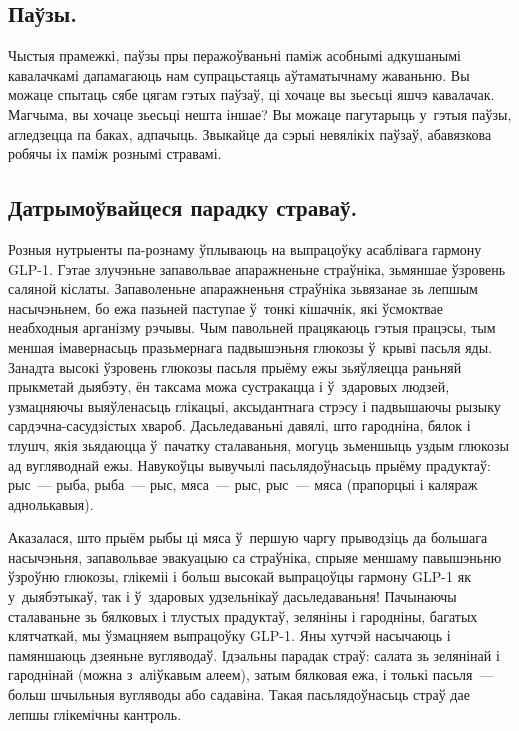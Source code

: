
\subsection{Паўзы.}
Чыстыя прамежкі, паўзы пры перажоўваньні паміж асобнымі адкушанымі кавалачкамі дапамагаюць нам супрацьстаяць аўтаматычнаму жаваньню. Вы можаце спытаць сябе цягам гэтых паўзаў, ці хочаце вы зьесьці яшчэ кавалачак. Магчыма, вы хочаце зьесьці нешта іншае? Вы можаце пагутарыць у~гэтыя паўзы, агледзецца па баках, адпачыць. Звыкайце да сэрыі невялікіх паўзаў, абавязкова робячы іх паміж рознымі стравамі.

\subsection{Датрымоўвайцеся парадку страваў.}
Розныя нутрыенты па-рознаму ўплываюць на выпрацоўку асаблівага гармону GLP-1. Гэтае злучэньне запавольвае апаражненьне страўніка, зьмяншае ўзровень саляной кіслаты. Запаволеньне апаражненьня страўніка зьвязанае зь лепшым насычэньнем, бо ежа пазьней паступае ў~тонкі кішачнік, які ўсмоктвае неабходныя арганізму рэчывы. Чым павольней працякаюць гэтыя працэсы, тым меншая імавернасьць празьмернага падвышэньня глюкозы ў~крыві пасьля яды. Занадта высокі ўзровень глюкозы пасьля прыёму ежы зьяўляецца раньняй прыкметай дыябэту, ён таксама можа сустракацца і ў~здаровых людзей, узмацняючы выяўленасьць глікацыі, аксыдантнага стрэсу і падвышаючы рызыку сардэчна-сасудзістых хвароб. Дасьледаваньні давялі, што гародніна, бялок і тлушч, якія зьядаюцца ў~пачатку сталаваньня, могуць зьменшыць уздым глюкозы ад вугляводнай ежы. Навукоўцы вывучылі пасьлядоўнасьць прыёму прадуктаў: рыс~--- рыба, рыба~--- рыс, мяса~--- рыс, рыс~--- мяса (прапорцыі і каляраж аднолькавыя).

Аказалася, што прыём рыбы ці мяса ў~першую чаргу прыводзіць да большага насычэньня, запавольвае эвакуацыю са страўніка, спрыяе меншаму павышэньню ўзроўню глюкозы, глікеміі і больш высокай выпрацоўцы гармону GLP-1 як у~дыябэтыкаў, так і ў~здаровых удзельнікаў дасьледаваньня! Пачынаючы сталаваньне зь бялковых і тлустых прадуктаў, зеляніны і гародніны, багатых клятчаткай, мы ўзмацняем выпрацоўку GLP-1. Яны хутчэй насычаюць і памяншаюць дзеяньне вугляводаў. Ідэальны парадак страў: салата зь зелянінай і гароднінай (можна з~аліўкавым алеем), затым бялковая ежа, і толькі пасьля~--- больш шчыльныя вугляводы або садавіна. Такая пасьлядоўнасьць страў дае лепшы глікемічны кантроль.

